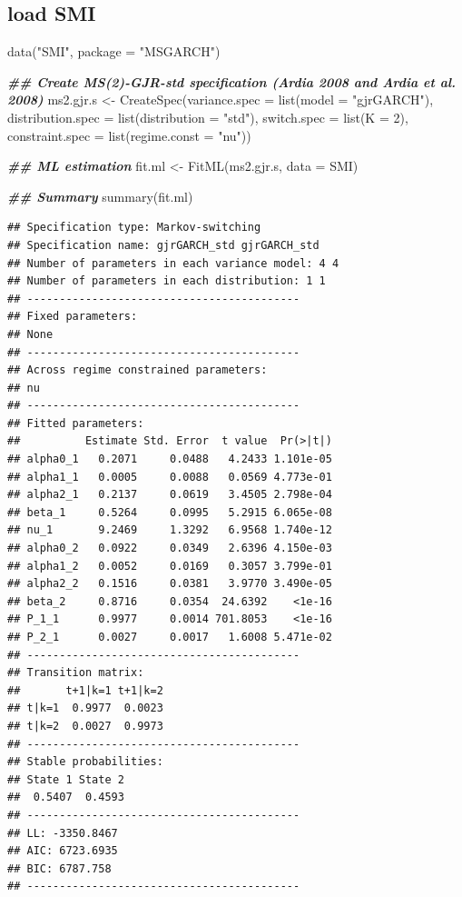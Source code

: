 \documentclass[
]{article}
\newenvironment{Shaded}{\begin{snugshade}}{\end{snugshade}}
\newcommand{\AttributeTok}[1]{\textcolor[rgb]{0.77,0.63,0.00}{#1}}
\newcommand{\DecValTok}[1]{\textcolor[rgb]{0.00,0.00,0.81}{#1}}
\newcommand{\DocumentationTok}[1]{\textcolor[rgb]{0.56,0.35,0.01}{\textbf{\textit{#1}}}}
\newcommand{\FunctionTok}[1]{\textcolor[rgb]{0.00,0.00,0.00}{#1}}
\newcommand{\NormalTok}[1]{#1}
\newcommand{\OtherTok}[1]{\textcolor[rgb]{0.56,0.35,0.01}{#1}}
\newcommand{\StringTok}[1]{\textcolor[rgb]{0.31,0.60,0.02}{#1}}
\begin{document}
\hypertarget{load-smi}{%
\subsection{load SMI}\label{load-smi}}

\begin{Shaded}
\begin{Highlighting}[]
\FunctionTok{data}\NormalTok{(}\StringTok{"SMI"}\NormalTok{, }\AttributeTok{package =} \StringTok{"MSGARCH"}\NormalTok{)}

\DocumentationTok{\#\# Create MS(2){-}GJR{-}std specification (Ardia 2008 and Ardia et al. 2008)}
\NormalTok{ms2.gjr.s }\OtherTok{\textless{}{-}} \FunctionTok{CreateSpec}\NormalTok{(}\AttributeTok{variance.spec =} \FunctionTok{list}\NormalTok{(}\AttributeTok{model =} \StringTok{"gjrGARCH"}\NormalTok{),}
                        \AttributeTok{distribution.spec =} \FunctionTok{list}\NormalTok{(}\AttributeTok{distribution =} \StringTok{"std"}\NormalTok{),}
                        \AttributeTok{switch.spec =} \FunctionTok{list}\NormalTok{(}\AttributeTok{K =} \DecValTok{2}\NormalTok{),}
                        \AttributeTok{constraint.spec =} \FunctionTok{list}\NormalTok{(}\AttributeTok{regime.const =} \StringTok{"nu"}\NormalTok{))}

\DocumentationTok{\#\# ML estimation}
\NormalTok{fit.ml }\OtherTok{\textless{}{-}} \FunctionTok{FitML}\NormalTok{(ms2.gjr.s, }\AttributeTok{data =}\NormalTok{ SMI)}

\DocumentationTok{\#\# Summary}
\FunctionTok{summary}\NormalTok{(fit.ml)}
\end{Highlighting}
\end{Shaded}

\begin{verbatim}
## Specification type: Markov-switching
## Specification name: gjrGARCH_std gjrGARCH_std
## Number of parameters in each variance model: 4 4
## Number of parameters in each distribution: 1 1
## ------------------------------------------
## Fixed parameters:
## None
## ------------------------------------------
## Across regime constrained parameters:
## nu 
## ------------------------------------------
## Fitted parameters:
##          Estimate Std. Error  t value  Pr(>|t|)
## alpha0_1   0.2071     0.0488   4.2433 1.101e-05
## alpha1_1   0.0005     0.0088   0.0569 4.773e-01
## alpha2_1   0.2137     0.0619   3.4505 2.798e-04
## beta_1     0.5264     0.0995   5.2915 6.065e-08
## nu_1       9.2469     1.3292   6.9568 1.740e-12
## alpha0_2   0.0922     0.0349   2.6396 4.150e-03
## alpha1_2   0.0052     0.0169   0.3057 3.799e-01
## alpha2_2   0.1516     0.0381   3.9770 3.490e-05
## beta_2     0.8716     0.0354  24.6392    <1e-16
## P_1_1      0.9977     0.0014 701.8053    <1e-16
## P_2_1      0.0027     0.0017   1.6008 5.471e-02
## ------------------------------------------
## Transition matrix:
##       t+1|k=1 t+1|k=2
## t|k=1  0.9977  0.0023
## t|k=2  0.0027  0.9973
## ------------------------------------------
## Stable probabilities:
## State 1 State 2 
##  0.5407  0.4593 
## ------------------------------------------
## LL: -3350.8467
## AIC: 6723.6935
## BIC: 6787.758
## ------------------------------------------
\end{verbatim}
\end{document}

